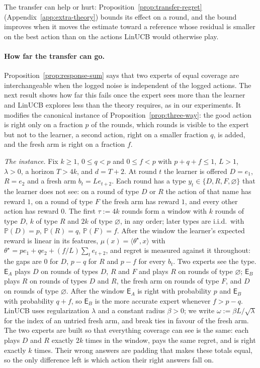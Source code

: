 \documentclass[anon]{alt2027} %
\newcommand{\Prb}{\mathbb{P}}
\newcommand{\Exp}{\mathsf{E}}
\begin{document}
The transfer can help or hurt: Proposition~\ref{prop:transfer-regret}
(Appendix~\ref{app:extra-theory}) bounds its effect on a round, and the bound improves when it moves the
estimate toward a reference whose residual is smaller on the best action than
on the actions LinUCB would otherwise play.

\paragraph{How far the transfer can go.}
Proposition~\ref{prop:response-sum} says that two experts of equal coverage
are interchangeable when the logged noise is independent of the logged
actions. The next result shows how far this fails once the expert sees more
than the learner and LinUCB explores less than the theory requires, as in our
experiments. It modifies the canonical instance of
Proposition~\ref{prop:three-way}: the good action is right only on a fraction
$p$ of the rounds, which rounds is visible to the expert but not to the
learner, a second action, right on a smaller fraction $q$, is added, and the
fresh arm is right on a fraction $f$.

\emph{The instance.} Fix $k\ge1$, $0\le q<p$ and $0\le f<p$ with $p+q+f\le1$,
$L>1$, $\lambda>0$, a horizon $T>4k$, and $d=T+2$. At round $t$ the learner is
offered $D=e_1$, $R=e_2$ and a fresh arm $b_t=Le_{t+2}$. Each round has a type
$y_t\in\{D,R,F,\varnothing\}$ that the learner does not see: on a round of
type $D$ or $R$ the action of that name has reward $1$, on a round of type $F$
the fresh arm has reward $1$, and every other action has reward $0$. The
first $\tau:=4k$ rounds form a window with $k$ rounds of type $D$, $k$ of type
$R$ and $2k$ of type $\varnothing$, in any order; later types are i.i.d.\ with
$\Prb(D)=p$, $\Prb(R)=q$, $\Prb(F)=f$. After the window the learner's expected
reward is linear in its features, $\mu(x)=\langle\theta^\star,x\rangle$ with
$\theta^\star=pe_1+qe_2+(f/L)\sum_{t}e_{t+2}$, and regret is measured against
it throughout: the gaps are $0$ for $D$, $p-q$ for $R$ and $p-f$ for every
$b_t$. Two experts see the type. $\Exp_A$ plays $D$ on rounds of types $D$,
$R$ and $F$ and plays $R$ on rounds of type $\varnothing$; $\Exp_B$ plays $R$
on rounds of types $D$ and $R$, the fresh arm on rounds of type $F$, and $D$
on rounds of type $\varnothing$. After the window $\Exp_A$ is right with
probability $p$ and $\Exp_B$ with probability $q+f$, so $\Exp_B$ is the more
accurate expert whenever $f>p-q$. LinUCB uses regularization $\lambda$ and a
constant radius $\beta>0$; we write $\omega:=\beta L/\sqrt\lambda$ for the
index of an untried fresh arm, and break ties in favour of the fresh arm.
The two experts are built so that everything coverage can see is the same:
each plays $D$ and $R$ exactly $2k$ times in the window, pays the same
regret, and is right exactly $k$ times. Their wrong answers are padding that
makes these totals equal, so the only difference left is which action their
right answers fall on.
\end{document}
